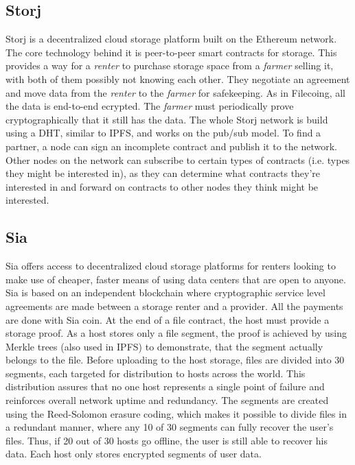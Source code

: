 \documentclass[12pt]{report}
\begin{document}
\subsection{Storj}

Storj \cite{storj} is a decentralized cloud storage platform built on the Ethereum network. The core technology behind it is peer-to-peer smart contracts for storage. This provides a way for a \textit{renter} to purchase storage space from a \textit{farmer} selling it, with both of them possibly not knowing each other. They negotiate an agreement and move data from the \textit{renter} to the \textit{farmer} for safekeeping. As in Filecoing, all the data is end-to-end ecrypted. The \textit{farmer} must periodically prove cryptographically that it still has the data. The whole Storj network is build using a DHT, similar to IPFS, and works on the pub/sub model. To find a partner, a node can sign an incomplete contract and publish it to the network. Other nodes on the network can subscribe to certain types of contracts (i.e. types they might be interested in), as they can determine what contracts they’re interested in and forward on contracts to other nodes they think might be interested.

\subsection{Sia}

Sia \cite{sia} offers access to decentralized cloud storage platforms for renters looking to make use of cheaper, faster means of using data centers that are open to anyone. Sia is based on an independent blockchain where cryptographic service level agreements are made between a storage renter and a provider. All the payments are done with Sia coin. At the end of a file contract, the host must provide a storage proof. As a host stores only a file segment, the proof is achieved by using Merkle trees (also used in IPFS) to demonstrate, that the segment actually belongs to the file. Before uploading to the host storage, files are divided into 30 segments, each targeted for distribution to hosts across the world. This distribution assures that no one host represents a single point of failure and reinforces overall network uptime and redundancy. The segments are created using the Reed-Solomon erasure coding, which makes it possible to divide files in a redundant manner, where any 10 of 30 segments can fully recover the user's files. Thus, if 20 out of 30 hosts go offline, the user is still able to recover his data. Each host only stores encrypted segments of user data. 
\end{document}

